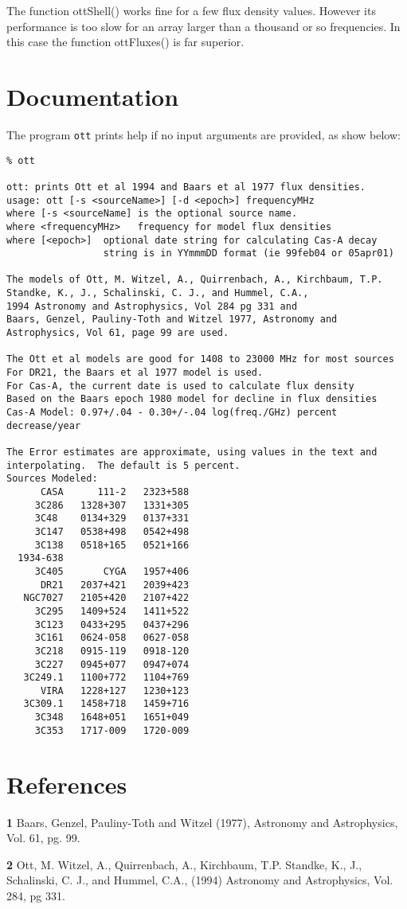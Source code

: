 The function ottShell() works fine for a few flux density values.  However
its performance is too slow for an array larger than a thousand or so
frequencies.  In this case the function ottFluxes() is far superior.

\section{Documentation}
The program {\tt ott} prints help if no input arguments are provided,
as show below:

\begin{verbatim}
% ott

ott: prints Ott et al 1994 and Baars et al 1977 flux densities.
usage: ott [-s <sourceName>] [-d <epoch>] frequencyMHz
where [-s <sourceName] is the optional source name. 
where <frequencyMHz>   frequency for model flux densities
where [<epoch>]  optional date string for calculating Cas-A decay
                 string is in YYmmmDD format (ie 99feb04 or 05apr01)

The models of Ott, M. Witzel, A., Quirrenbach, A., Kirchbaum, T.P.
Standke, K., J., Schalinski, C. J., and Hummel, C.A.,
1994 Astronomy and Astrophysics, Vol 284 pg 331 and
Baars, Genzel, Pauliny-Toth and Witzel 1977, Astronomy and
Astrophysics, Vol 61, page 99 are used.

The Ott et al models are good for 1408 to 23000 MHz for most sources
For DR21, the Baars et al 1977 model is used.
For Cas-A, the current date is used to calculate flux density
Based on the Baars epoch 1980 model for decline in flux densities
Cas-A Model: 0.97+/.04 - 0.30+/-.04 log(freq./GHz) percent decrease/year

The Error estimates are approximate, using values in the text and
interpolating.  The default is 5 percent.
Sources Modeled:
      CASA      111-2   2323+588
     3C286   1328+307   1331+305
     3C48    0134+329   0137+331
     3C147   0538+498   0542+498
     3C138   0518+165   0521+166
  1934-638
     3C405       CYGA   1957+406
      DR21   2037+421   2039+423
   NGC7027   2105+420   2107+422
     3C295   1409+524   1411+522
     3C123   0433+295   0437+296
     3C161   0624-058   0627-058
     3C218   0915-119   0918-120
     3C227   0945+077   0947+074
   3C249.1   1100+772   1104+769
      VIRA   1228+127   1230+123
   3C309.1   1458+718   1459+716
     3C348   1648+051   1651+049
     3C353   1717-009   1720-009
\end{verbatim}

\section{\Large \bf References}
\begin{description}
\item{\bf 1} Baars, Genzel, Pauliny-Toth and Witzel (1977), Astronomy and
Astrophysics, Vol. 61, pg. 99.
\item{\bf 2} Ott, M. Witzel, A., Quirrenbach, A., Kirchbaum, T.P.
Standke, K., J., Schalinski, C. J., and Hummel, C.A.,
(1994) Astronomy and Astrophysics, Vol. 284, pg 331.
\end{description}

